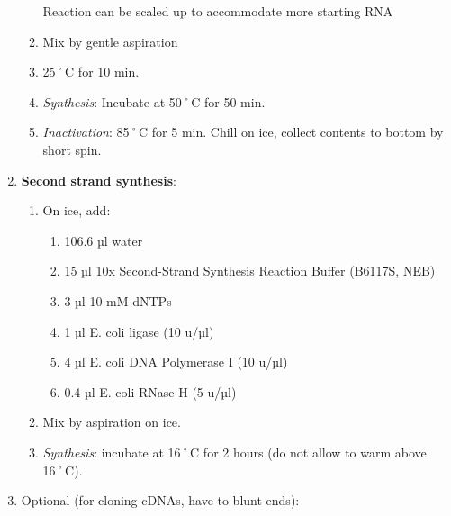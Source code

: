 \documentclass[
  letterpaper,
  DIV=11,
  numbers=noendperiod]{scrreprt}
\providecommand{\tightlist}{%
  \setlength{\itemsep}{0pt}\setlength{\parskip}{0pt}}\usepackage{longtable,booktabs,array}
\begin{document}
\begin{enumerate}
\begin{enumerate}
    \begin{tcolorbox}[enhanced jigsaw, toprule=.15mm, breakable, coltitle=black, leftrule=.75mm, title=\textcolor{quarto-callout-important-color}{\faExclamation}\hspace{0.5em}{NOTE}, bottomrule=.15mm, toptitle=1mm, bottomtitle=1mm, colframe=quarto-callout-important-color-frame, opacityback=0, colback=white, opacitybacktitle=0.6, colbacktitle=quarto-callout-important-color!10!white, rightrule=.15mm, titlerule=0mm, arc=.35mm, left=2mm]

    Reaction can be scaled up to accommodate more starting RNA

    \end{tcolorbox}
  \item
    Mix by gentle aspiration
  \item
    25˚C for 10 min.
  \item
    \emph{Synthesis}: Incubate at 50˚C for 50 min.
  \item
    \emph{Inactivation}: 85˚C for 5 min. Chill on ice, collect contents
    to bottom by short spin.
  \end{enumerate}
\item
  \textbf{Second strand synthesis}:

  \begin{enumerate}
  \def\labelenumii{\arabic{enumii}.}
  \item
    On ice, add:

    \begin{enumerate}
    \def\labelenumiii{\arabic{enumiii}.}
    \tightlist
    \item
      106.6 µl water
    \item
      15 µl 10x Second-Strand Synthesis Reaction Buffer (B6117S, NEB)
    \item
      3 µl 10 mM dNTPs
    \item
      1 µl E. coli ligase (10 u/µl)
    \item
      4 µl E. coli DNA Polymerase I (10 u/µl)
    \item
      0.4 µl E. coli RNase H (5 u/µl)
    \end{enumerate}
  \item
    Mix by aspiration on ice.
  \item
    \emph{Synthesis}: incubate at 16˚C for 2 hours (do not allow to warm
    above 16˚C).
  \end{enumerate}
\item
  Optional (for cloning cDNAs, have to blunt ends):


\end{enumerate}
\end{document}
